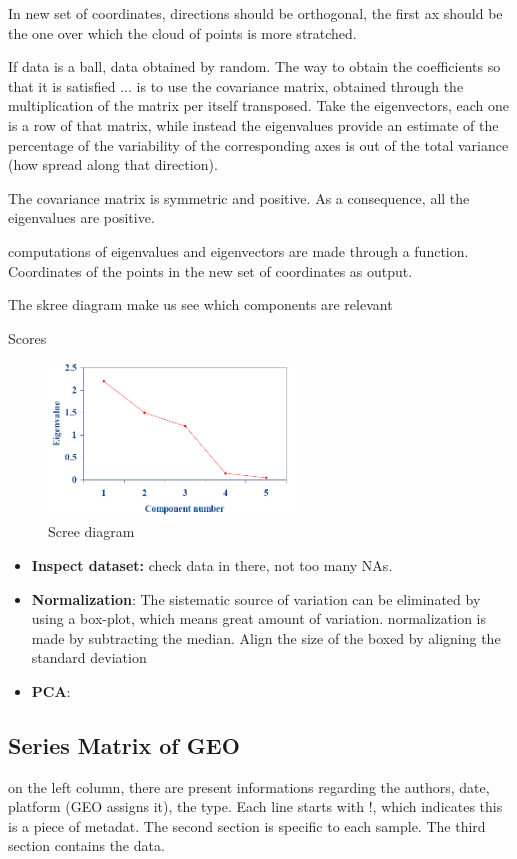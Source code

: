 In new set of coordinates, directions should be orthogonal, the first ax should be the one over which the cloud of points is more stratched. 

If data is a ball, data obtained by random. The way to obtain the coefficients so that it is satisfied ... is to use the covariance matrix, obtained through the multiplication of the matrix per itself transposed. Take the eigenvectors, each one is a row of that matrix, while instead the eigenvalues provide an estimate of the percentage of the variability of the corresponding axes is out of the total variance (how spread along that direction).

The covariance matrix is symmetric and positive. As a consequence, all the eigenvalues are positive. 

computations of eigenvalues and eigenvectors are made through a function. Coordinates of the points in the new set of coordinates as output. 

The skree diagram make us see which components are relevant

Scores %


\begin{figure}[h]
\caption{Scree diagram}
\centering
\includegraphics[width=0.6\textwidth]{skreeDiagram}
\end{figure}


\begin{itemize}
	\item \textbf{Inspect dataset:} check data in there, not too many NAs. 
	\item \textbf{Normalization}: The sistematic source of variation can be eliminated by using a box-plot, which means great amount of variation. normalization is made by subtracting the median.
Align the size of the boxed by aligning the standard deviation
	\item \textbf{PCA}:
\end{itemize}



\subsection{Series Matrix of GEO}
on the left column, there are present informations regarding the authors, date, platform (GEO assigns it), the type. Each line starts with !, which indicates this is a piece of metadat. The second section is specific to each sample. The third section contains the data. 



